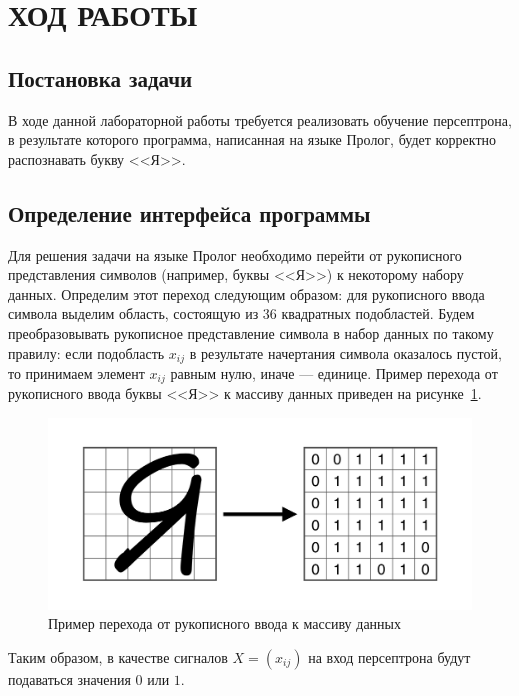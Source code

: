 \section{ХОД РАБОТЫ}

\subsection{Постановка задачи}

В ходе данной лабораторной работы требуется реализовать обучение
персептрона, в результате которого программа, написанная на языке Пролог,
будет корректно распознавать букву <<Я>>.

\subsection{Определение интерфейса программы}

Для решения задачи на языке Пролог необходимо перейти от рукописного
представления символов (например, буквы <<Я>>) к некоторому набору данных.
Определим этот переход следующим образом: для рукописного ввода символа
выделим область, состоящую из $36$ квадратных подобластей.
Будем преобразовывать рукописное представление символа в набор данных по такому
правилу: если подобласть $x_{ij}$ в результате начертания символа оказалось пустой,
то принимаем элемент $x_{ij}$ равным нулю, иначе --- единице.
Пример перехода от рукописного ввода буквы <<Я>> к массиву
данных приведен на рисунке~\ref{fig:symbol_to_matrix}.
\begin{figure}[h!]
  \centering
  \includegraphics[width=150mm]{img/symbol_to_matrix}
  \caption{Пример перехода от рукописного ввода к массиву данных}
  \label{fig:symbol_to_matrix}
\end{figure}

Таким образом, в качестве сигналов $X =( x_{ij} )$ на вход персептрона
будут подаваться значения $0$ или $1$.


